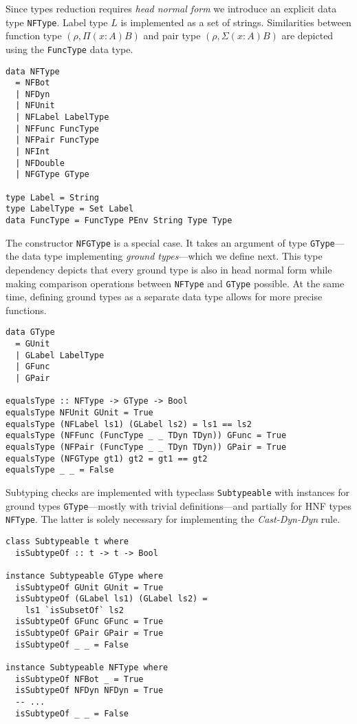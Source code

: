 Since types reduction requires \emph{head normal form} we introduce an explicit data type \texttt{NFType}. Label type $L$ is implemented as a set of strings. Similarities between function type $(\rho, \Pi(x:A)B)$ and pair type $(\rho, \Sigma(x:A)B)$ are  depicted using the \texttt{FuncType} data type.

\begin{lstlisting}[caption=ProcessEnvironment.hs]
data NFType
  = NFBot
  | NFDyn
  | NFUnit
  | NFLabel LabelType
  | NFFunc FuncType
  | NFPair FuncType
  | NFInt
  | NFDouble
  | NFGType GType

type Label = String
type LabelType = Set Label
data FuncType = FuncType PEnv String Type Type
\end{lstlisting}

The constructor \texttt{NFGType} is a special case. It takes an argument of type \texttt{GType}---the data type implementing \emph{ground types}---which we define next. This type dependency depicts that every ground type is also in head normal form while making comparison operations between \texttt{NFType} and \texttt{GType} possible. At the same time, defining ground types as a separate data type allows for more precise functions.

\begin{lstlisting}[caption=ProcessEnvironment.hs,label=lst:gtype]
data GType
  = GUnit
  | GLabel LabelType
  | GFunc
  | GPair

equalsType :: NFType -> GType -> Bool
equalsType NFUnit GUnit = True
equalsType (NFLabel ls1) (GLabel ls2) = ls1 == ls2
equalsType (NFFunc (FuncType _ _ TDyn TDyn)) GFunc = True
equalsType (NFPair (FuncType _ _ TDyn TDyn)) GPair = True
equalsType (NFGType gt1) gt2 = gt1 == gt2
equalsType _ _ = False
\end{lstlisting}

Subtyping checks are implemented with typeclass \texttt{Subtypeable} with instances for ground types \texttt{GType}---mostly with trivial definitions---and partially for HNF types \texttt{NFType}. The latter is solely necessary for implementing the \emph{Cast-Dyn-Dyn} rule.

\begin{lstlisting}[caption=ProcessEnvironment.hs]
class Subtypeable t where
  isSubtypeOf :: t -> t -> Bool

instance Subtypeable GType where
  isSubtypeOf GUnit GUnit = True
  isSubtypeOf (GLabel ls1) (GLabel ls2) =
    ls1 `isSubsetOf` ls2
  isSubtypeOf GFunc GFunc = True
  isSubtypeOf GPair GPair = True
  isSubtypeOf _ _ = False

instance Subtypeable NFType where
  isSubtypeOf NFBot _ = True
  isSubtypeOf NFDyn NFDyn = True
  -- ...
  isSubtypeOf _ _ = False
\end{lstlisting}

